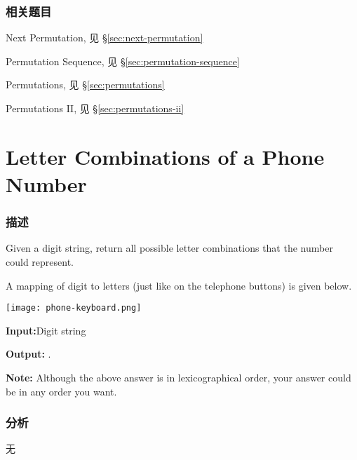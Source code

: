 \subsubsection{相关题目}
\begindot
\item Next Permutation, 见 \S \ref{sec:next-permutation}
\item Permutation Sequence, 见 \S \ref{sec:permutation-sequence}
\item Permutations, 见 \S \ref{sec:permutations}
\item Permutations II, 见 \S \ref{sec:permutations-ii}
\myenddot


\section{Letter Combinations of a Phone Number } %
\label{sec:letter-combinations-of-a-phone-number }


\subsubsection{描述}
Given a digit string, return all possible letter combinations that the number could represent.

A mapping of digit to letters (just like on the telephone buttons) is given below.

\begin{center}
\texttt{[image: phone-keyboard.png]}\\
\label{fig:phone-keyboard}
\end{center}

\textbf{Input:}Digit string 

\textbf{Output:} \code{["ad", "ae", "af", "bd", "be", "bf", "cd", "ce", "cf"]}.

\textbf{Note:}
Although the above answer is in lexicographical order, your answer could be in any order you want.


\subsubsection{分析}
无


